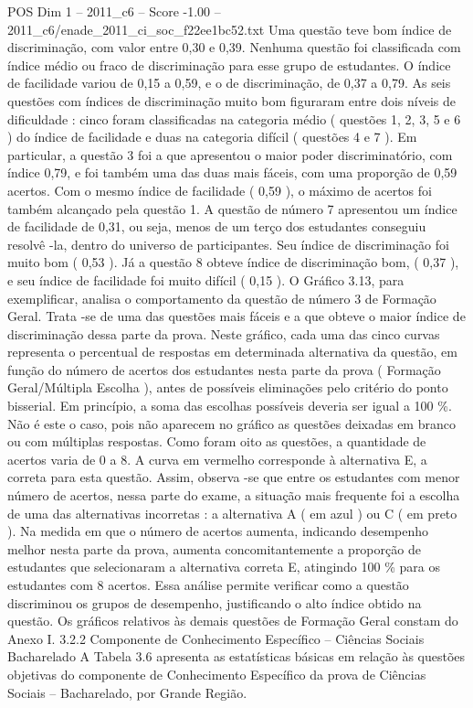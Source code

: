 \begin{textsample}{POS Dim 1 – 2011\_c6 – Score -1.00 – 2011\_c6/enade\_2011\_ci\_soc\_f22ee1bc52.txt}
Uma questão teve bom índice de discriminação, com valor entre 0,30 e 0,39.
Nenhuma questão foi classificada com índice médio ou fraco de discriminação para esse grupo de estudantes.
O índice de facilidade variou de 0,15 a 0,59, e o de discriminação, de 0,37 a 0,79.
As seis questões com índices de discriminação muito bom figuraram entre dois níveis de dificuldade : cinco foram classificadas na categoria médio ( questões 1, 2, 3, 5 e 6 ) do índice de facilidade e duas na categoria difícil ( questões 4 e 7 ).
Em particular, a questão 3 foi a que apresentou o maior poder discriminatório, com índice 0,79, e foi também uma das duas mais fáceis, com uma proporção de 0,59 acertos.
Com o mesmo índice de facilidade ( 0,59 ), o máximo de acertos foi também alcançado pela questão 1.
A questão de número 7 apresentou um índice de facilidade de 0,31, ou seja, menos de um terço dos estudantes conseguiu resolvê -la, dentro do universo de participantes.
Seu índice de discriminação foi muito bom ( 0,53 ).
Já a questão 8 obteve índice de discriminação bom, ( 0,37 ), e seu índice de facilidade foi muito difícil ( 0,15 ).
O Gráfico 3.13, para exemplificar, analisa o comportamento da questão de número 3 de Formação Geral.
Trata -se de uma das questões mais fáceis e a que obteve o maior índice de discriminação dessa parte da prova.
Neste gráfico, cada uma das cinco curvas representa o percentual de respostas em determinada alternativa da questão, em função do número de acertos dos estudantes nesta parte da prova ( Formação Geral/Múltipla Escolha ), antes de possíveis eliminações pelo critério do ponto bisserial.
Em princípio, a soma das escolhas possíveis deveria ser igual a 100 \%.
Não é este o caso, pois não aparecem no gráfico as questões deixadas em branco ou com múltiplas respostas.
Como foram oito as questões, a quantidade de acertos varia de 0 a 8.
A curva em vermelho corresponde à alternativa E, a correta para esta questão.
Assim, observa -se que entre os estudantes com menor número de acertos, nessa parte do exame, a situação mais frequente foi a escolha de uma das alternativas incorretas : a alternativa A ( em azul ) ou C ( em preto ).
Na medida em que o número de acertos aumenta, indicando desempenho melhor nesta parte da prova, aumenta concomitantemente a proporção de estudantes que selecionaram a alternativa correta E, atingindo 100 \% para os estudantes com 8 acertos.
Essa análise permite verificar como a questão discriminou os grupos de desempenho, justificando o alto índice obtido na questão.
Os gráficos relativos às demais questões de Formação Geral constam do Anexo I. 3.2.2 Componente de Conhecimento Específico – Ciências Sociais Bacharelado A Tabela 3.6 apresenta as estatísticas básicas em relação às questões objetivas do componente de Conhecimento Específico da prova de Ciências Sociais – Bacharelado, por Grande Região.

\end{textsample}
